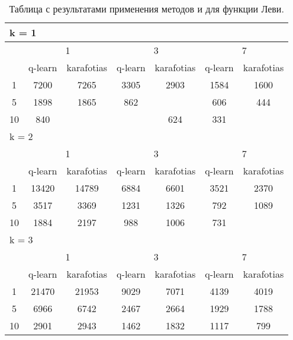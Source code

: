 \begin{table}
  \centering
  \begin{tabular}{|*7{c|}}
  \hline
  \multicolumn{7}{|l|}{k = 1} \\
  \hline
  \multirow{2}{*}{\diagbox{$\mu$}{$\lambda$}} & \multicolumn{2}{c|}{1} & \multicolumn{2}{c|}{3} & \multicolumn{2}{c|}{7} \\
  \cline{2-7}
  & q-learn & karafotias & q-learn & karafotias & q-learn & karafotias \\
  \hline
  1 & 7200 & 7265 & 3305 & 2903 & 1584 & 1600 \\
  \hline
  5 & 1898 & 1865 & 862 & \cellcolor{olive}{794} & 606 & 444 \\
  \hline
  10 & 840& \cellcolor{olive}{804} & \cellcolor{olive}{502} & 624 & 331 & \cellcolor{olive}{294} \\
  \hline
  \multicolumn{7}{|l|}{k = 2} \\
  \hline
  \multirow{2}{*}{\diagbox{$\mu$}{$\lambda$}} & \multicolumn{2}{c|}{1} & \multicolumn{2}{c|}{3} & \multicolumn{2}{c|}{7} \\
  \cline{2-7}
  & q-learn & karafotias & q-learn & karafotias & q-learn & karafotias \\
  \hline
  1 & 13420 & 14789 & 6884 & 6601 & 3521 & 2370 \\
  \hline
  5 & 3517 & 3369 & 1231 & 1326 & 792 & 1089 \\
  \hline
  10 & 1884 & 2197 & 988 & 1006 & 731& \cellcolor{olive}{564} \\
  \hline
  \multicolumn{7}{|l|}{k = 3} \\
  \hline
  \multirow{2}{*}{\diagbox{$\mu$}{$\lambda$}} & \multicolumn{2}{c|}{1} & \multicolumn{2}{c|}{3} & \multicolumn{2}{c|}{7} \\
  \cline{2-7}
  & q-learn & karafotias & q-learn & karafotias & q-learn & karafotias \\
  \hline
  1 & 21470 & 21953 & 9029 & 7071 & 4139 & 4019 \\
  \hline
  5 & 6966 & 6742& 2467 & 2664 & 1929 & 1788 \\
  \hline
  10 & 2901 & 2943 & 1462 & 1832 & 1117 & 799 \\
  \hline
  \end{tabular}
  \captionsetup{justification=centering}
  \caption{Таблица с результатами применения методов  и  для функции Леви.}
\end{table}


